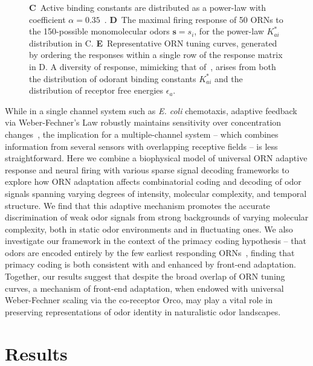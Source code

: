 \documentclass[9pt,twocolumn,twoside,lineno]{pnas-new}
\begin{document}
\begin{figure}[!tb]
{{		\textbf{C}~Active binding constants are distributed as a power-law with coefficient $\alpha=0.35$~\cite{si2017invariances}.
		\textbf{D}~The maximal firing response of 50 ORNs to the 150-possible monomolecular odors $\mathbf s = s_i$, for the power-law $K^*_{ai}$ distribution in C.
		\textbf{E}~Representative ORN tuning curves, generated by ordering the responses within a single row of the response matrix in D. A diversity of response, mimicking that of~\cite{hallem_carlson}, arises from both the distribution of odorant binding constants $K^*_{ai}$ and the distribution of receptor free energies $\epsilon_a$.}}
		\label{fig:tuning_curves}
\end{figure}

While in a single channel system such as \textit{E. coli} chemotaxis, adaptive feedback via Weber-Fechner's Law robustly maintains sensitivity over concentration changes~\cite{robustness_alon}, the implication for a multiple-channel system -- which combines information from several sensors with overlapping receptive fields  -- is less straightforward. Here we combine a biophysical model of universal ORN adaptive response and neural firing with various sparse signal decoding frameworks to explore how ORN adaptation affects combinatorial coding and decoding of odor signals spanning varying degrees of intensity, molecular complexity, and temporal structure. We find that this adaptive mechanism promotes the accurate  discrimination of weak odor signals from strong backgrounds of varying molecular complexity, both in static odor environments  and in fluctuating ones. We also investigate our framework in the context of the primacy coding hypothesis  -- that odors are encoded entirely by the few earliest responding ORNs~\cite{primacy_coding, primacy_math}, finding that primacy coding is both consistent with and enhanced by front-end adaptation. Together, our results suggest that despite the broad overlap of ORN tuning curves, a mechanism of front-end adaptation, when endowed with universal Weber-Fechner scaling via the co-receptor Orco, may play a vital role in preserving representations of odor identity in naturalistic odor landscapes.


\section*{Results}



\end{document}
